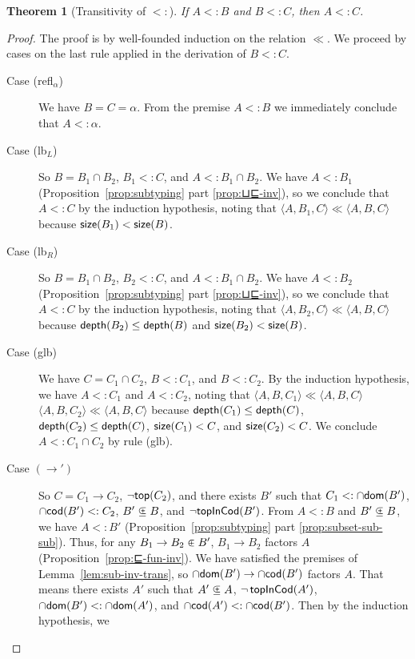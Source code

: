 \documentclass{article}
\newtheorem{theorem}{Theorem}
\begin{document}
\begin{theorem}[Transitivity of $<:$]\label{thm:⊑-trans}
    If $A <: B$ and $B <: C$, then $A <: C$.
\end{theorem}
\begin{proof}
  The proof is by well-founded induction on the relation $\ll$.
  We proceed by cases on the last rule applied in the
  derivation of $B <: C$.
  \begin{description}
  \item[Case (refl$_\alpha$)] We have $B = C = \alpha$.  From the premise $A <:
    B$ we immediately conclude that $A <: \alpha$.
  \item[Case (lb$_L$)] So $B = B_1 \cap B_2$, $B_1 <: C$, and $A <: B_1 \cap
    B_2$.  We have $A <: B_1$ (Proposition~\ref{prop:subtyping} part
    \ref{prop:⊔⊑-inv}), so we conclude that $A <: C$ by the induction
    hypothesis, noting that $\langle A, B_1, C \rangle \ll \langle A,
    B, C \rangle$ because $\mathsf{size}(B_1) < \mathsf{size}(B)$.
  \item[Case (lb$_R$)] So $B = B_1 \cap B_2$, $B_2 <: C$, and $A <: B_1 \cap
    B_2$.  We have $A <: B_2$ (Proposition~\ref{prop:subtyping} part
    \ref{prop:⊔⊑-inv}), so we conclude that $A <: C$ by the induction
    hypothesis, noting that $\langle A, B_2, C \rangle \ll \langle A,
    B, C \rangle$ because $\mathsf{depth}(B_2) \leq \mathsf{depth}(B)$ and $\mathsf{size}(B_2)
    < \mathsf{size}(B)$.
  \item[Case (glb)] We have $C = C_1 \cap C_2$, $B <: C_1$, and $B <:
    C_2$.  By the induction hypothesis, we have $A <: C_1$ and $A <:
    C_2$, noting that $\langle A, B, C_1 \rangle \ll \langle A, B, C
    \rangle$ $\langle A, B, C_2 \rangle \ll \langle A, B, C\rangle$
    because $\mathsf{depth}(C_1) \leq \mathsf{depth}(C)$, $\mathsf{depth}(C_2) \leq
    \mathsf{depth}(C)$, $\mathsf{size}(C_1) < C$, and $\mathsf{size}(C_2) < C$.
    We conclude $A <: C_1 \cap C_2$ by rule (glb).
  \item[Case $(\to')$] So $C = C_1 \to C_2$, $\neg \mathsf{top}(C_2)$, and
    there exists $B'$ such that $C_1 <: \cap\mathsf{dom}(B')$, $\cap\mathsf{cod}(B') <: C_2$,
    $B' \subsetpluseq B$, and $\neg \mathsf{topInCod}(B')$. From $A <: B$ and $B' \subsetpluseq B$, we
    have $A <: B'$ (Proposition~\ref{prop:subtyping} part
    \ref{prop:subset-sub-sub}). Thus, for any $B_1 \to B_2 \inplus B'$,
    $B_1 \to B_2$ factors $A$ (Proposition~\ref{prop:⊑-fun-inv}). We
    have satisfied the premises of Lemma~\ref{lem:sub-inv-trans}, so
    $\cap\mathsf{dom}(B') \to \cap\mathsf{cod}(B')$ factors $A$. That means there exists $A'$
    such that $A' \subsetpluseq A$, $\neg\,\mathsf{topInCod}(A')$, $\cap\mathsf{dom}(B') <: \cap\mathsf{dom}(A')$,
    and $\cap\mathsf{cod}(A') <: \cap\mathsf{cod}(B')$. Then by the induction hypothesis, we

\end{description}
\end{proof}
\end{document}
